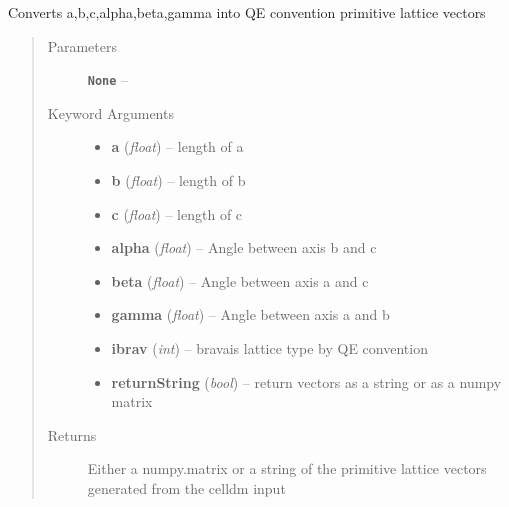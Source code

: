 \documentclass[letterpaper,10pt,english]{sphinxmanual}
\begin{document}
\begin{fulllineitems}
\label{retr:retr.abc2free}
Converts a,b,c,alpha,beta,gamma into QE convention primitive lattice vectors
\begin{quote}\begin{description}
\item[{Parameters}] \leavevmode
\textbf{\texttt{None}} -- 

\item[{Keyword Arguments}] \leavevmode\begin{itemize}
\item {} 
\textbf{a} (\emph{float}) --
length of a

\item {} 
\textbf{b} (\emph{float}) --
length of b

\item {} 
\textbf{c} (\emph{float}) --
length of c

\item {} 
\textbf{alpha} (\emph{float}) --
Angle between axis b and c

\item {} 
\textbf{beta} (\emph{float}) --
Angle between axis a and c

\item {} 
\textbf{gamma} (\emph{float}) --
Angle between axis a and b

\item {} 
\textbf{ibrav} (\emph{int}) --
bravais lattice type by QE convention

\item {} 
\textbf{returnString} (\emph{bool}) --
return vectors as a string or as a numpy matrix

\end{itemize}

\item[{Returns}] \leavevmode
Either a numpy.matrix or a string of the primitive lattice vectors generated from the celldm input

\end{description}\end{quote}

\end{fulllineitems}

\end{document}
